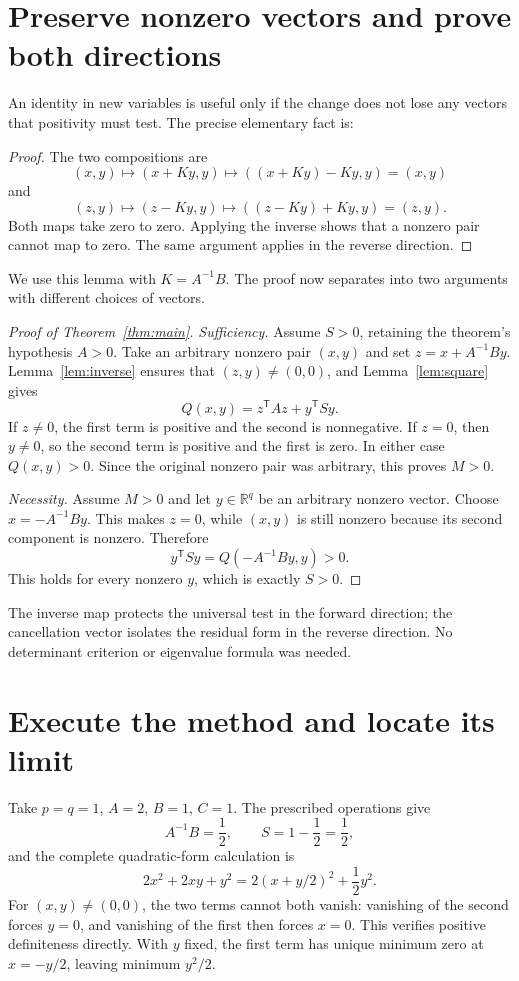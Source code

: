 \documentclass[12pt,reqno]{amsart}
\begin{document}
\section{Preserve nonzero vectors and prove both directions}
An identity in new variables is useful only if the change does not lose
any vectors that positivity must test. The precise elementary fact is:
\begin{lemma}\label{lem:inverse}

\end{lemma}
\begin{proof}
The two compositions are
\[
 (x,y)\longmapsto(x+Ky,y)\longmapsto((x+Ky)-Ky,y)=(x,y)
\]
and
\[
 (z,y)\longmapsto(z-Ky,y)\longmapsto((z-Ky)+Ky,y)=(z,y).
\]
Both maps take zero to zero. Applying the inverse shows that a nonzero
pair cannot map to zero. The same argument applies in the reverse direction.
\end{proof}
We use this lemma with $K=A^{-1}B$. The proof now separates into two
arguments with different choices of vectors.

\begin{proof}[Proof of Theorem~\ref{thm:main}]
\emph{Sufficiency.} Assume $S>0$, retaining the theorem's hypothesis $A>0$.
Take an arbitrary nonzero pair $(x,y)$ and set $z=x+A^{-1}By$.
Lemma~\ref{lem:inverse} ensures that $(z,y)\ne(0,0)$, and
Lemma~\ref{lem:square} gives
\[
 Q(x,y)=z^{\mathsf T}Az+y^{\mathsf T}Sy.
\]
If $z\ne0$, the first term is positive and the second is nonnegative.
If $z=0$, then $y\ne0$, so the second term is positive and the first
is zero. In either case $Q(x,y)>0$. Since the original nonzero pair was
arbitrary, this proves $M>0$.

\emph{Necessity.} Assume $M>0$ and let $y\in\mathbb R^q$ be an arbitrary
nonzero vector. Choose $x=-A^{-1}By$. This makes $z=0$, while $(x,y)$
is still nonzero because its second component is nonzero. Therefore
\[
 y^{\mathsf T}Sy=Q(-A^{-1}By,y)>0.
\]
This holds for every nonzero $y$, which is exactly $S>0$.
\end{proof}
The inverse map protects the universal test in the forward direction;
the cancellation vector isolates the residual form in the reverse
direction. No determinant criterion or eigenvalue formula was needed.

\section{Execute the method and locate its limit}
Take $p=q=1$, $A=2$, $B=1$, $C=1$. The prescribed operations give
\[
 A^{-1}B=\frac12,\qquad S=1-\frac12=\frac12,
\]
and the complete quadratic-form calculation is
\[
 2x^2+2xy+y^2=2(x+y/2)^2+\frac12y^2.
\]
For $(x,y)\ne(0,0)$, the two terms cannot both vanish: vanishing of the
second forces $y=0$, and vanishing of the first then forces $x=0$.
This verifies positive definiteness directly. With $y$ fixed, the first
term has unique minimum zero at $x=-y/2$, leaving minimum $y^2/2$.
\end{document}
